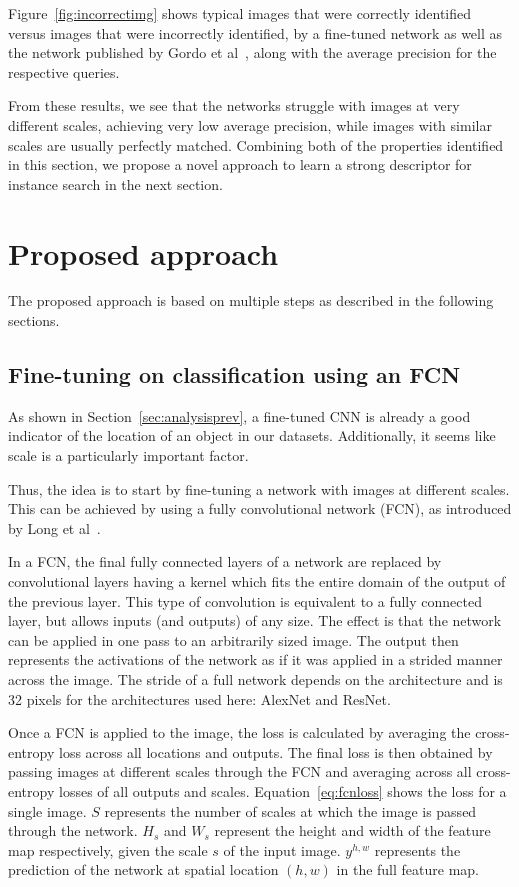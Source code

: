 Figure~\ref{fig:incorrectimg}
shows typical images that were correctly identified versus images that
were incorrectly identified, by a fine-tuned network as well as the network
published by Gordo et al~\cite{gordo_deep_2016}, along with the average
precision for the respective queries.

From these results, we see that the networks struggle with images at
very different scales, achieving very low average precision,
while images with similar scales are usually perfectly matched.
Combining both of the properties identified in this section, we
propose a novel approach to learn a strong descriptor for instance
search in the next section.

\section{Proposed approach}\label{sec:proposed}
The proposed approach is based on multiple steps as described in the
following sections.

\subsection{Fine-tuning on classification using an FCN}\label{sec:fcnfinetune}
As shown in Section~\ref{sec:analysisprev}, a fine-tuned CNN is already
a good indicator of the location of an object in our datasets.
Additionally, it seems like scale is a particularly important factor.

Thus, the idea is to start by fine-tuning a network with images
at different scales. This can be achieved by using a fully
convolutional network (FCN), as introduced by
Long et al~\cite{long_fully_2015}.

In a FCN, the final fully connected layers
of a network are replaced by convolutional layers having a kernel
which fits the entire domain of the output of the previous layer.
This type of convolution is equivalent to a fully connected layer,
but allows inputs (and outputs) of any size.
The effect is that the network can be applied in one pass to an
arbitrarily sized image. The output then represents the activations
of the network as if it was applied in a strided manner across the image.
The stride of a full network depends on the architecture and is 32
pixels for the architectures used here: AlexNet and ResNet.

Once a FCN is applied to the image, the loss
is calculated by averaging the cross-entropy loss across all locations
and outputs.
The final loss is then obtained by passing images at different scales
through the FCN and averaging across all cross-entropy losses of all
outputs and scales. Equation~\ref{eq:fcnloss} shows the loss for a
single image. $S$ represents the number of scales at which the image
is passed through the network.
$H_s$ and $W_s$ represent the height and width of the feature
map respectively, given the scale $s$ of the input image. $y^{h,w}$
represents the prediction of the network at spatial location
$(h,w)$ in the full feature map.

